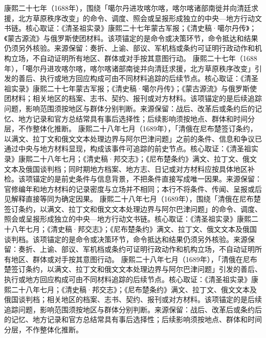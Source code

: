 康熙二十七年（1688年），围绕「噶尔丹进攻喀尔喀，喀尔喀诸部南徙并向清廷求援，北方草原秩序改变」的命令、调度、照会或呈报形成独立的中央—地方行动文书链。核心取证：《清圣祖实录》康熙二十七年蒙古军报；《清史稿·噶尔丹传》；《蒙古源流》与俄罗斯使团材料。该项锚定的是命令或决策环节，命令抵达和结果仍须另外核验。来源保留：奏折、上谕、部议、军机档或条约可证明行政动作和机构立场，不自动证明所有地区、群体或对手按其意图行动。
康熙二十七年（1688年），「噶尔丹进攻喀尔喀，喀尔喀诸部南徙并向清廷求援，北方草原秩序改变」引发的善后、执行或地方回应构成可由不同材料追踪的后续节点。核心取证：《清圣祖实录》康熙二十七年蒙古军报；《清史稿·噶尔丹传》；《蒙古源流》与俄罗斯使团材料；相关地区的档案、志书、契约、报刊或对方材料。该项锚定的是后续追踪问题，影响范围须按地区与群体分别判断。来源保留：战后、改革后或条约后的记忆、地方记录和官方总结常具有事后选择性；后续影响须按地点、群体和时间分层，不作整体化推断。
康熙二十八年七月（1689年），「清俄在尼布楚签订条约，以满文、拉丁文和俄文文本处理边界与阿尔巴津问题」之前的条件、信息和争议已通过中央与地方材料显现，构成该事件可追踪的前史节点。核心取证：《清圣祖实录》康熙二十八年七月；《清史稿·邦交志》；《尼布楚条约》满文、拉丁文、俄文文本及俄国谈判档；同时期地方档案、地方志、日记或对方材料应按具体地区补检。该项锚定的是前史条件与信息背景，不把条件直接写成唯一因果。来源保留：官修编年和地方材料的记录密度与立场并不相同；本行不将条件、传闻、呈报或后见解释直接等同为确定因果。
康熙二十八年七月（1689年），围绕「清俄在尼布楚签订条约，以满文、拉丁文和俄文文本处理边界与阿尔巴津问题」的命令、调度、照会或呈报形成独立的中央—地方行动文书链。核心取证：《清圣祖实录》康熙二十八年七月；《清史稿·邦交志》；《尼布楚条约》满文、拉丁文、俄文文本及俄国谈判档。该项锚定的是命令或决策环节，命令抵达和结果仍须另外核验。来源保留：奏折、上谕、部议、军机档或条约可证明行政动作和机构立场，不自动证明所有地区、群体或对手按其意图行动。
康熙二十八年七月（1689年），「清俄在尼布楚签订条约，以满文、拉丁文和俄文文本处理边界与阿尔巴津问题」引发的善后、执行或地方回应构成可由不同材料追踪的后续节点。核心取证：《清圣祖实录》康熙二十八年七月；《清史稿·邦交志》；《尼布楚条约》满文、拉丁文、俄文文本及俄国谈判档；相关地区的档案、志书、契约、报刊或对方材料。该项锚定的是后续追踪问题，影响范围须按地区与群体分别判断。来源保留：战后、改革后或条约后的记忆、地方记录和官方总结常具有事后选择性；后续影响须按地点、群体和时间分层，不作整体化推断。
